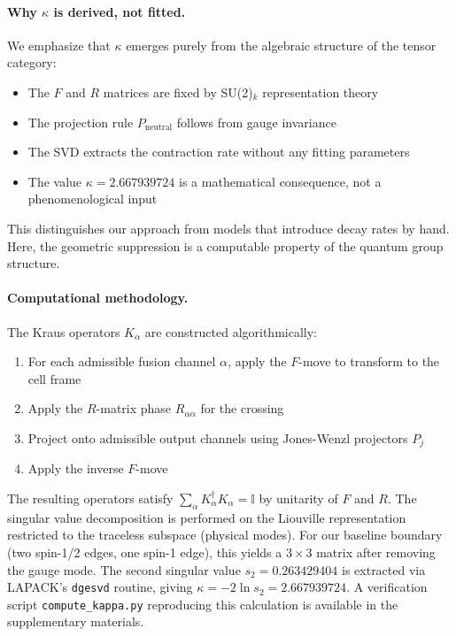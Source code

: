 \documentclass[11pt]{article}
\theoremstyle{plain}
\theoremstyle{definition}
\begin{document}
\paragraph{Why $\kappa$ is derived, not fitted.}
We emphasize that $\kappa$ emerges purely from the algebraic structure of the tensor category:
\begin{itemize}
  \item The $F$ and $R$ matrices are fixed by SU(2)$_k$ representation theory
  \item The projection rule $P_{\text{neutral}}$ follows from gauge invariance
  \item The SVD extracts the contraction rate without any fitting parameters
  \item The value $\kappa = 2.667939724$ is a mathematical consequence, not a phenomenological input
\end{itemize}
This distinguishes our approach from models that introduce decay rates by hand. Here, the geometric suppression is a computable property of the quantum group structure.

\paragraph{Computational methodology.}
The Kraus operators $K_\alpha$ are constructed algorithmically:
\begin{enumerate}
  \item For each admissible fusion channel $\alpha$, apply the $F$-move to transform to the cell frame
  \item Apply the $R$-matrix phase $R_{\alpha\alpha}$ for the crossing
  \item Project onto admissible output channels using Jones-Wenzl projectors $P_j$
  \item Apply the inverse $F$-move
\end{enumerate}
The resulting operators satisfy $\sum_\alpha K_\alpha^\dagger K_\alpha = \mathbb{I}$ by unitarity of $F$ and $R$. The singular value decomposition is performed on the Liouville representation restricted to the traceless subspace (physical modes). For our baseline boundary (two spin-1/2 edges, one spin-1 edge), this yields a $3 \times 3$ matrix after removing the gauge mode. The second singular value $s_2 = 0.263429404$ is extracted via LAPACK's \texttt{dgesvd} routine, giving $\kappa = -2\ln s_2 = 2.667939724$. A verification script \texttt{compute\_kappa.py} reproducing this calculation is available in the supplementary materials.
\end{document}
